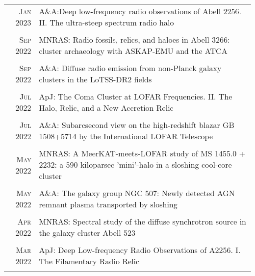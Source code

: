 \documentclass[11pt,a4paper,notitlepage]{article}
\begin{document}
\begin{tabular}{r|p{12.5cm}}
	
%	
	\textsc{Jan 2023} & A\&A:Deep low-frequency radio observations of Abell 2256. II. The ultra-steep spectrum radio halo \citep{2023AA...669A...1R} \\
	\multicolumn{2}{c}{} \\

	\textsc{Sep 2022} & MNRAS: Radio fossils, relics, and haloes in Abell 3266: cluster archaeology with ASKAP-EMU and the ATCA \citep{2022MNRAS.515.1871R} \\
	\multicolumn{2}{c}{} \\

	\textsc{Sep 2022} & A\&A: Diffuse radio emission from non-Planck galaxy clusters in the LoTSS-DR2 fields \citep{2022AA...665A..60H} \\
	\multicolumn{2}{c}{} \\

	\textsc{Jul 2022} & ApJ: The Coma Cluster at LOFAR Frequencies. II. The Halo, Relic, and a New Accretion Relic \citep{2022ApJ...933..218B} \\
	\multicolumn{2}{c}{} \\

	\textsc{Jul 2022} & A\&A: Subarcsecond view on the high-redshift blazar GB 1508+5714 by the International LOFAR Telescope \citep{2022AA...663A..44K} \\
	\multicolumn{2}{c}{} \\

	\textsc{May 2022} & MNRAS: A MeerKAT-meets-LOFAR study of MS 1455.0 + 2232: a 590 kiloparsec 'mini'-halo in a sloshing cool-core cluster \citep{2022MNRAS.512.4210R} \\
	\multicolumn{2}{c}{} \\

	\textsc{May 2022} & A\&A: The galaxy group NGC 507: Newly detected AGN remnant plasma transported by sloshing \citep{2022AA...661A..92B} \\
	\multicolumn{2}{c}{} \\

	\textsc{Apr 2022} & MNRAS: Spectral study of the diffuse synchrotron source in the galaxy cluster Abell 523 \citep{2022MNRAS.511.3389V} \\
	\multicolumn{2}{c}{} \\

	\textsc{Mar 2022} & ApJ: Deep Low-frequency Radio Observations of A2256. I. The Filamentary Radio Relic \citep{2022ApJ...927...80R} \\
	\multicolumn{2}{c}{} \\


\end{tabular}
\end{document}
